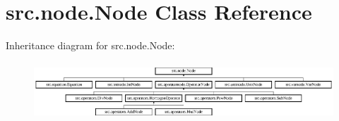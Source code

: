 \hypertarget{classsrc_1_1node_1_1Node}{}\section{src.\+node.\+Node Class Reference}
\label{classsrc_1_1node_1_1Node}
Inheritance diagram for src.\+node.\+Node\+:\begin{figure}[H]
\begin{center}
\leavevmode
\includegraphics[height=2.196079cm]{classsrc_1_1node_1_1Node}
\end{center}
\end{figure}
